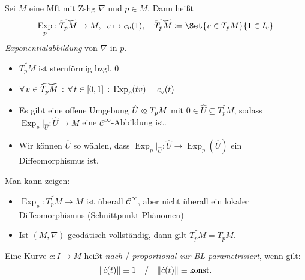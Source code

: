 \documentclass{cheat-sheet}
\DeclareMathOperator{\Exp}{Exp} %
\newcommand{\Cont}{\mathcal{C}} %
\begin{document}

\begin{defn}
  Sei $M$ eine Mft mit Zshg $\nabla$ und $p \in M$. Dann heißt
  \[
    \Exp_p : \widetilde{T_p M} \to M, \enspace
    v \mapsto c_v(1), \quad
    \widetilde{T_p M} \coloneqq \Set{ v \in T_p M }{ 1 \in I_v }
  \]
  \emph{Exponentialabbildung} von $\nabla$ in $p$.
\end{defn}

\begin{lem}
  \begin{itemize}
    \item $\widetilde{T_p M}$ ist sternförmig bzgl. $0$
    \item $\fa{v \in \widetilde{T_p M}} \fa{t \in \cinterval{0}{1}} \Exp_p(tv) = c_v(t)$
  \end{itemize}
\end{lem}

\begin{satz}
  \begin{itemize}
    \item Es gibt eine offene Umgebung $\hat{U} \opn T_p M$ mit $0 \in \hat{U} \subseteq \widetilde{T_p M}$, sodass $\Exp_p|_{\hat{U}} : \hat{U} \to M$ eine $\Cont^\infty$-Abbildung ist.
    \item Wir können $\hat{U}$ so wählen, dass $\Exp_p|_{\hat{U}} : \hat{U} \to \Exp_p(\hat{U})$ ein Diffeomorphismus ist.
  \end{itemize}
\end{satz}

\begin{bem}
  Man kann zeigen: \enspace
  \begin{itemize}
    \item $\Exp_p : \widetilde{T_p M} \to M$ ist überall $\Cont^\infty$, aber nicht überall ein lokaler Diffeomorphismus (Schnittpunkt-Phänomen)
    \item Ist $(M, \nabla)$ geodätisch vollständig, dann gilt $\widetilde{T_p M} = T_p M$.
  \end{itemize}
\end{bem}



\begin{defn}
  Eine Kurve $c : I \to M$ heißt \emph{nach} / \emph{proportional zur BL parametrisiert}, wenn gilt:
  \[
    \lVert\dot{c}(t)\rVert \equiv 1
    \quad / \quad
    \lVert\dot{c}(t)\rVert \equiv \text{konst}.
  \]
\end{defn}
\end{document}
